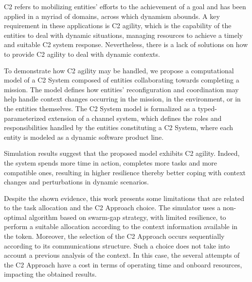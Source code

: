 C2 refers to mobilizing entities' efforts to the achievement of a goal and has been applied in a myriad of domains, across which dynamism abounds. A key requirement in these applications is C2 agility, which is the capability of the entities to deal with dynamic situations,  managing resources to achieve a timely and suitable C2 system response. Nevertheless, there is a lack of solutions on how to provide C2 agility to deal with dynamic contexts.

To demonstrate how C2 agility may be handled, we propose a computational model of a C2 System composed of entities collaborating towards completing a mission. The model defines how entities' reconfiguration and coordination may help handle context changes occurring in the mission, in the environment, or in the entities themselves. The C2 System model is formalized as a typed-parameterized extension of a channel system, which defines the roles and responsibilities handled by the entities constituting a C2 System, where each entity is modeled as a dynamic software product line. 





Simulation results suggest that the proposed model exhibits C2 agility. Indeed, the system spends more time in action, completes more tasks and more compatible ones, resulting in higher resilience thereby better coping with context changes and perturbations in dynamic scenarios.

Despite the shown evidence, this work presents some limitations that are related to the task allocation and the C2 Approach choice. The simulator uses a non-optimal algorithm based on swarm-gap strategy, with limited resilience, to perform a suitable allocation according to the context information available in the token. Moreover, the selection of the C2 Approach occurs sequentially according to its communications structure. Such a choice does not take into account a previous analysis of the context. In this case, the several attempts of the C2 Approach have a cost in terms of operating time and onboard resources, impacting the obtained results.


